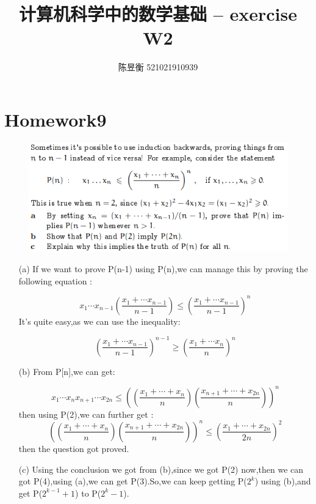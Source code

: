 \documentclass[]{article}
\title{计算机科学中的数学基础 -- exercise W2}
\author{陈昱衡 521021910939}
\begin{document}
\maketitle
\section*{Homework9}
\begin{figure}[htb]
	\includegraphics[scale=1]{Q9}
\end{figure}
\begin{enumerate}
	\item[(a)]
	If we want to prove P(n-1) using P(n),we can manage this by proving the following equation :\par 
	\begin{equation}
		x_{1}\cdots x_{n-1} (\frac{x_{1}+\cdots x_{n-1}}{n-1}) \le (\frac{x_{1}+\cdots x_{n-1}}{n-1})^{n}
	\end{equation}
	It's quite easy,as we can use the inequality:\par 
	\begin{equation}
		(\frac{x_{1}+\cdots x_{n-1}}{n-1})^{n-1} \ge (\frac{x_{1}+\cdots x_{n}}{n})^{n}
	\end{equation}
	\item[(b)]
	From P[n],we can get:\par
	\begin{equation}
		x_{1}\cdots x_{n}x_{n+1}\cdots x_{2n} \le ((\frac{x_{1}+\cdots+ x_{n}}{n})(\frac{x_{n+1}+\cdots+ x_{2n}}{n}))^{n}
	\end{equation}
	then using P(2),we can further get :
	\begin{equation}
		((\frac{x_{1}+\cdots+ x_{n}}{n})(\frac{x_{n+1}+\cdots+ x_{2n}}{n}))^{n}
		\le
		(\frac{x_{1}+\cdots+ x_{2n}}{2n})^{2}
	\end{equation}
	then the question got proved.\par 
	\item[(c)]
	Using the conclusion we got from (b),since we got P(2) now,then we can got P(4),using (a),we can get P(3).So,we can keep getting P($2^{k}$) using (b),and get P($2^{k-1}+1$) to P($2^{k}-1$).
\end{enumerate}
\end{document}
